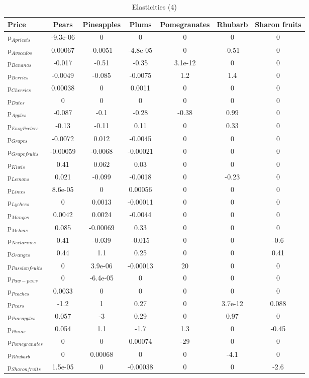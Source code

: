 \documentclass[11pt]{article}
\begin{document}
\begin{table}[h]
\caption{Elasticities (4)}
\label{table:elasticities 4}
\begin{center}
\begin{tabular}{lcccccc} \hline \hline
Price &Pears &Pineapples &Plums &Pomegranates &Rhubarb &Sharon fruits \\ \hline
p$_{Apricots}$ &-9.3e-06 &0 &0 &0 &0 &0 \\
p$_{Avocados}$ &0.00067 &-0.0051 &-4.8e-05 &0 &-0.51 &0 \\
p$_{Bananas}$ &-0.017 &-0.51 &-0.35 &3.1e-12 &0 &0 \\
p$_{Berries}$ &-0.0049 &-0.085 &-0.0075 &1.2 &1.4 &0 \\
p$_{Cherries}$ &0.00038 &0 &0.0011 &0 &0 &0 \\
p$_{Dates}$ &0 &0 &0 &0 &0 &0 \\
p$_{Apples}$ &-0.087 &-0.1 &-0.28 &-0.38 &0.99 &0 \\
p$_{Easy Peelers}$ &-0.13 &-0.11 &0.11 &0 &0.33 &0 \\
p$_{Grapes}$ &-0.0072 &0.012 &-0.0045 &0 &0 &0 \\
p$_{Grapefruits}$ &-0.00059 &-0.0068 &-0.00021 &0 &0 &0 \\
p$_{Kiwis}$ &0.41 &0.062 &0.03 &0 &0 &0 \\
p$_{Lemons}$ &0.021 &-0.099 &-0.0018 &0 &-0.23 &0 \\
p$_{Limes}$ &8.6e-05 &0 &0.00056 &0 &0 &0 \\
p$_{Lychees}$ &0 &0.0013 &-0.00011 &0 &0 &0 \\
p$_{Mangos}$ &0.0042 &0.0024 &-0.0044 &0 &0 &0 \\
p$_{Melons}$ &0.085 &-0.00069 &0.33 &0 &0 &0 \\
p$_{Nectarines}$ &0.41 &-0.039 &-0.015 &0 &0 &-0.6 \\
p$_{Oranges}$ &0.44 &1.1 &0.25 &0 &0 &0.41 \\
p$_{Passion fruits}$ &0 &3.9e-06 &-0.00013 &20 &0 &0 \\
p$_{Paw-paws}$ &0 &-6.4e-05 &0 &0 &0 &0 \\
p$_{Peaches}$ &0.0033 &0 &0 &0 &0 &0 \\
p$_{Pears}$ &-1.2 &1 &0.27 &0 &3.7e-12 &0.088 \\
p$_{Pineapples}$ &0.057 &-3 &0.29 &0 &0.97 &0 \\
p$_{Plums}$ &0.054 &1.1 &-1.7 &1.3 &0 &-0.45 \\
p$_{Pomegranates}$ &0 &0 &0.00074 &-29 &0 &0 \\
p$_{Rhubarb}$ &0 &0.00068 &0 &0 &-4.1 &0 \\
p$_{Sharon fruits}$ &1.5e-05 &0 &-0.00038 &0 &0 &-2.6 \\
\end{tabular}
\end{center}
\end{table}
\end{document}

